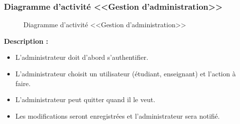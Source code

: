 \documentclass[12pt]{report}
\begin{document}
\newpage

\subsubsection{Diagramme d'activité <<Gestion d'administration>>}

\begin{figure}[h]
\centering
    \centerline{}
    \caption{Diagramme d'activité <<Gestion d'administration>>}
\end{figure}

\textbf{Description :}

\begin{itemize}
    \item L’administrateur doit d’abord s’authentifier.
    \item L’administrateur choisit un utilisateur (étudiant, enseignant) et l’action à faire.
    \item L’administrateur peut quitter quand il le veut.
    \item Les modifications seront enregistrées et l’administrateur sera notifié.
\end{itemize}
\end{document}
